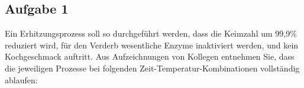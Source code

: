 \documentclass[a4paper,11pt]{article}
\newif\ifshowme
\begin{document}
%
%
%
%
%
%
%
%
%
%
%
%
\subsection*{Aufgabe 1}
Ein Erhitzungsprozess soll so durchgeführt werden, dass die Keimzahl um 99,9\%
reduziert wird, für den Verderb wesentliche Enzyme inaktiviert werden, und kein
Kochgeschmack auftritt. Aus Aufzeichnungen von Kollegen entnehmen Sie, dass die
jeweiligen Prozesse bei folgenden Zeit-Temperatur-Kombinationen vollständig ablaufen:
\end{document}
